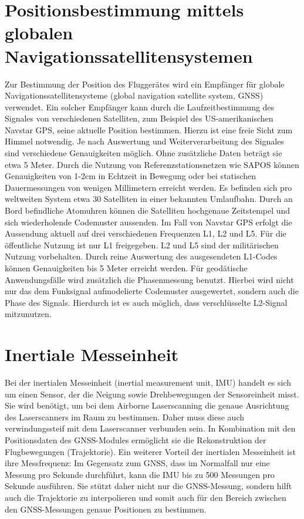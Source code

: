\documentclass[a4paper,12pt,bibliography=totoc, listof=totoc,titlepage,pointlessnumbers]{scrreprt}
\begin{document}
\section{Positionsbestimmung mittels globalen Navigationssatellitensystemen}
\label{s:GNSS}
Zur Bestimmung der Position des Fluggerätes wird ein Empfänger für globale Navigationssatellitensysteme (global navigation satellite system, GNSS) verwendet. Ein solcher Empfänger kann durch die Laufzeitbestimmung des Signales von verschiedenen Satelliten, zum Beispiel des US-amerikanischen Navstar GPS, seine aktuelle Position bestimmen. Hierzu ist eine freie Sicht zum Himmel notwendig. Je nach Auswertung und Weiterverarbeitung des Signales sind verschiedene Genauigkeiten möglich. Ohne zusätzliche Daten beträgt sie etwa 5 Meter. Durch die Nutzung von Referenzstationsnetzen wie SAPOS können Genauigkeiten von 1-2cm in Echtzeit in Bewegung oder bei statischen Dauermessungen von wenigen Millimetern erreicht werden. Es befinden sich pro weltweiten System etwa 30 Satelliten in einer bekannten Umlaufbahn. \citep[S. 375]{Witte2006}
Durch an Bord befindliche Atomuhren können die Satelliten hochgenaue Zeitstempel und sich wiederholende Codemuster aussenden. Im Fall von Navstar GPS erfolgt die Aussendung aktuell auf drei verschiedenen Frequenzen L1, L2 und L5. Für die öffentliche Nutzung ist nur L1 freigegeben. L2 und L5 sind der militärischen Nutzung vorbehalten. Durch reine Auswertung des ausgesendeten L1-Codes können Genauigkeiten bis 5 Meter erreicht werden. Für geodätische Anwendungsfälle wird zusätzlich die Phasenmessung benutzt. Hierbei wird nicht nur das dem Funksignal aufmodelierte Codemuster ausgewertet, sondern auch die Phase des Signals. Hierdurch ist es auch möglich, dass verschlüsselte L2-Signal mitzunutzen. \citep[S. 10f]{Witte2006}

\section{Inertiale Messeinheit}
\label{s:IMU}
Bei der inertialen Messeinheit (inertial measurement unit, IMU) handelt es sich um einen Sensor, der die Neigung sowie Drehbewegungen der Sensoreinheit misst. Sie wird benötigt, um bei dem Air\-borne Laser\-scan\-ning die genaue Ausrichtung des Laser\-scan\-ners im Raum zu bestimmen. Daher muss diese auch verwindungssteif mit dem Laser\-scan\-ner verbunden sein. In Kombination mit den Positionsdaten des GNSS-Modules ermöglicht sie die Rekonstruktion der Flugbewegungen (Trajektorie). Ein weiterer Vorteil der inertialen Messeinheit ist ihre Messfrequenz: Im Gegensatz zum GNSS, dass im Normalfall nur eine Messung pro Sekunde durchführt, kann die IMU bis zu 500 Messungen pro Sekunde ausführen. Sie stützt daher nicht nur die GNSS-Messung, sondern hilft auch die Trajektorie zu interpolieren und somit auch für den Bereich zwischen den GNSS-Messungen genaue Positionen zu bestimmen. \citep[S. 23ff]{beraldin}
\end{document}
